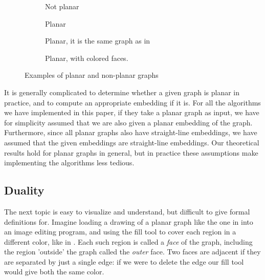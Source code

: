 \begin{figure}
    \centering
    \begin{subfigure}{.23\textwidth}
        \centering
        
        \caption{Not planar}
        \label{subfigure:k33}
    \end{subfigure}\hfill%
    \begin{subfigure}{.23\textwidth}
        \centering
        
        \caption{Planar}
        \label{subfigure:k4-a}
    \end{subfigure}\hfill%
    \begin{subfigure}{.23\textwidth}
        \centering
        
        \caption{Planar, it is the same graph as in }
        \label{subfigure:k4-b}
    \end{subfigure}\hfill%
    \begin{subfigure}{.23\textwidth}
        \centering
        
        \caption{Planar, with colored faces.}
        \label{subfigure:k4-c}
    \end{subfigure}
    \caption{Examples of planar and non-planar graphs}
\end{figure}

It is generally complicated to determine whether a given graph is planar in practice, and to compute an appropriate embedding if it is. For all the algorithms we have implemented in this paper, if they take a planar graph as input, we have for simplicity assumed that we are also given a planar embedding of the graph. Furthermore, since all planar graphs also have straight-line embeddings, we have assumed that the given embeddings are straight-line embeddings. Our theoretical results hold for planar graphs in general, but in practice these assumptions make implementing the algorithms less tedious.

\subsection{Duality}
The next topic is easy to visualize and understand, but difficult to give formal definitions for. Imagine loading a drawing of a planar graph like the one in  into an image editing program, and using the fill tool to cover each region in a different color, like in . Each such region is called a \emph{face} of the graph, including the region 'outside' the graph called the \emph{outer} face. Two faces are adjacent if they are separated by just a single edge: if we were to delete the edge our fill tool would give both the same color.

